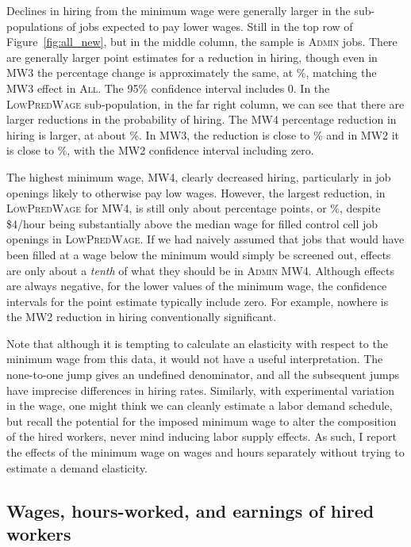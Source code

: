 \documentclass[AER]{AEA}
\newcommand{\all}{\textsc{All}}
\newcommand{\admin}{\textsc{Admin}}
\newcommand{\lpw}{\textsc{LowPredWage}}
\begin{document}
Declines in hiring from the minimum wage were generally larger in the sub-populations of jobs expected to pay lower wages.
Still in the top row of Figure~\ref{fig:all_new}, but in the middle column, the sample is \admin{} jobs.
There are generally larger point estimates for a reduction in hiring, though even in MW3 the percentage change is approximately the same, at \ADMINThreeItotalchargegtZeropctchange{}\%, matching the MW3 effect in \all{}.
The 95\% confidence interval includes $0$.
In the \lpw{} sub-population, in the far right column, we can see that there are larger reductions in the probability of hiring. 
The MW4 percentage reduction in hiring is larger, at about \LPWFourItotalchargegtZeropctchange{}\%.
In MW3, the reduction is close to \LPWThreeItotalchargegtZeropctchange{}\% and in MW2 it is close to \LPWTwoItotalchargegtZeropctchange{}\%, with the MW2 confidence interval including zero.

The highest minimum wage, MW4, clearly decreased hiring, particularly in job openings likely to otherwise pay low wages.
However, the largest reduction, in \lpw{} for MW4, is still only about \LPWFourItotalchargegtZeroeffects{} percentage points, or \LPWFourItotalchargegtZeropctchange{}\%, despite \$4/hour being substantially above the median wage for filled control cell job openings in \lpw{}.
If we had naively assumed that jobs that would have been filled at a wage below the minimum would simply be screened out, effects are only about a \emph{tenth} of what they should be in \admin{} MW4.
Although effects are always negative, for the lower values of the minimum wage, the confidence intervals for the point estimate typically include zero.
For example, nowhere is the MW2 reduction in hiring conventionally significant. 

Note that although it is tempting to calculate an elasticity with respect to the minimum wage from this data, it would not have a useful interpretation. 
The none-to-one jump gives an undefined denominator, and all the subsequent jumps have imprecise differences in hiring rates.
Similarly, with experimental variation in the wage, one might think we can cleanly estimate a labor demand schedule, but recall the potential for the imposed minimum wage to alter the composition of the hired workers, never mind inducing labor supply effects.
As such, I report the effects of the minimum wage on wages and hours separately without trying to estimate a demand elasticity.

\subsection{Wages, hours-worked, and earnings of hired workers} \label{sec:wages}
\end{document}
